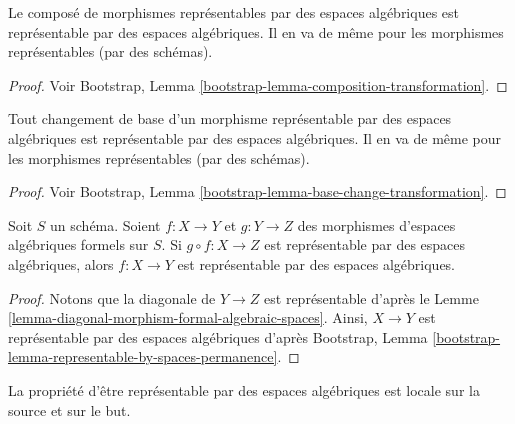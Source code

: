 \begin{lemma}
\label{lemma-composition-representable}
Le composé de morphismes représentables par des espaces algébriques est
représentable par des espaces algébriques. Il en va de même pour les morphismes représentables
(par des schémas).
\end{lemma}

\begin{proof}
Voir Bootstrap, Lemma \ref{bootstrap-lemma-composition-transformation}.
\end{proof}

\begin{lemma}
\label{lemma-base-change-representable}
Tout changement de base d'un morphisme représentable par des espaces algébriques est
représentable par des espaces algébriques. Il en va de même pour les morphismes représentables
(par des schémas).
\end{lemma}

\begin{proof}
Voir Bootstrap, Lemma \ref{bootstrap-lemma-base-change-transformation}.
\end{proof}

\begin{lemma}
\label{lemma-permanence-representable}
Soit $S$ un schéma. Soient $f : X \to Y$ et $g : Y \to Z$ des morphismes
d'espaces algébriques formels sur $S$. Si $g \circ f : X \to Z$ est représentable
par des espaces algébriques, alors $f : X \to Y$ est représentable par des espaces algébriques.
\end{lemma}

\begin{proof}
Notons que la diagonale de $Y \to Z$ est représentable d'après le
Lemme \ref{lemma-diagonal-morphism-formal-algebraic-spaces}.
Ainsi, $X \to Y$ est représentable par des espaces algébriques d'après
Bootstrap, Lemma \ref{bootstrap-lemma-representable-by-spaces-permanence}.
\end{proof}

\noindent
La propriété d'être représentable par des espaces algébriques est locale sur la
source et sur le but.

